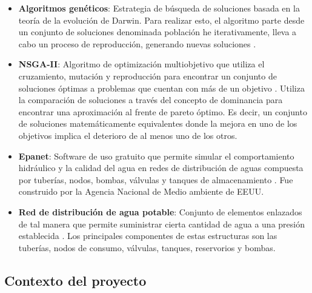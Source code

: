 \documentclass[11pt,letterpaper]{article}
\begin{document}
\begin{itemize}
\item \textbf{Algoritmos genéticos}: Estrategia de búsqueda de soluciones basada en la teoría de la evolución de Darwin. Para realizar esto, el algoritmo parte desde un conjunto de soluciones denominada población he iterativamente, lleva a cabo un proceso de reproducción, generando nuevas soluciones \cite{Heiss-Czedik1997}.

\item \textbf{NSGA-II}: Algoritmo de optimización multiobjetivo que utiliza el cruzamiento, mutación y reproducción para encontrar un conjunto de soluciones óptimas a problemas que cuentan con más de un objetivo \cite{Deb2002}. Utiliza la comparación de soluciones a través del concepto de dominancia para encontrar una aproximación al frente de pareto óptimo. Es decir, un conjunto de soluciones matemáticamente equivalentes donde la mejora en uno de los objetivos implica el deterioro de al menos uno de los otros.

\item \textbf{Epanet}: Software de uso gratuito que permite simular el comportamiento hidráulico y la calidad del agua en redes de distribución de aguas compuesta por tuberías, nodos, bombas, válvulas y tanques de almacenamiento \cite{Rossman2017}. Fue construido por la Agencia Nacional de Medio ambiente de EEUU.
\item \textbf{Red de distribución de agua potable}: Conjunto de elementos enlazados de tal manera que permite suministrar cierta cantidad de agua a una presión establecida \cite{Doctoral2012}. Los principales componentes de estas estructuras son las tuberías, nodos de consumo, válvulas, tanques, reservorios y bombas.  
 
\end{itemize}

\subsection{Contexto del proyecto} 
\end{document}

